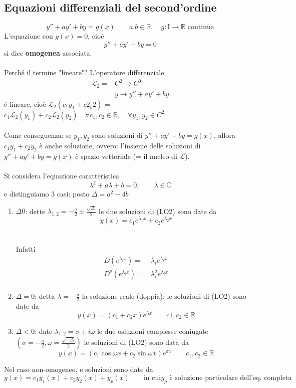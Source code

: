 \documentclass[x11names]{article}
\begin{document}
	\subsection{Equazioni differenziali del second'ordine}
	\[
	y'' + ay' + by = g(x) \qquad a.b \in \mathbb{R}, \quad g:\text{I} \to \mathbb{R} \text{ continua}
	\]
	L'equazione con $g(x) = 0$, cioè
	\[
	y'' + ay' + by = 0
	\]
	si dice \textbf{omogenea} associata. \\ \\
	
	\noindent
	Perché il termine "lineare"? L'operatore differenziale
	\begin{align*}
		\mathcal{L}_2 =& C^2 \to C^0 \\
		& y \to y'' + ay' + by
	\end{align*}
	è lineare, cioè $\mathcal{L}_2 (c_1y_1 + c2_y2)$ = $c_1 \mathcal{L}_2(y_1) + c_2 \mathcal{L}_2(y_2) \quad \forall c_1, c_2 \in \mathbb{R}, \quad \forall y_1,y_2 \in C^2$ \\ \\
	
	\noindent
	Come conseguenza: se $y_1,y_2$ sono soluzioni di $	y'' + ay' + by = g(x)$, allora $c_1y_1 + c_2y_2$ è anche soluzione, ovvero:
 l'insieme delle soluzioni di 	$y'' + ay' + by = g(x)$ è spazio vettoriale (= il nucleo di $\mathcal{L}$). \\ \\
 
\noindent
Si considera l'equazione caratteristica
\[
\lambda^2 + a \lambda + b = 0, \qquad \lambda \in \mathbb{C}
\]
e distinguiamo 3 casi: posto $\Delta = a^2 - 4b$

\begin{enumerate}
	\item $\Delta 0$: dette $\lambda_{1,2} = - \frac{a}{2} \pm \frac{\sqrt{\Delta}}{2}$ le due soluzioni di (LO2) sono date da 
	\[
	y(x) = c_1 e^{\lambda_1 x} + c_2 e^{\lambda_2 x} 
	\] \\ \\
	
	\noindent
	Infatti 
	\begin{align*}
		D\left(e^{\lambda_i x}\right) =& \lambda_i e^{\lambda_i x} \\ 
		D^2\left(e^{\lambda_i x}\right) =& \lambda_i^2 e^{\lambda_i x} \\ 
	\end{align*}
	\item $\Delta = 0$: detta $\lambda = - \frac{a}{2}$ la soluzione reale (doppia): le soluzioni di (LO2) sono date da 
	\[
	y(x) = \left(c_1 + c_2x\right)e^{\lambda x} \qquad c1, c_2 \in \mathbb{R}
	\]
	\item $\Delta < 0$: date $\lambda_{1,2} = \sigma \pm i \omega$ le due osluzioni complesse coniugate $\left(\sigma = - \frac{a}{2}, \omega = \frac{\sqrt{-\Delta}}{2}\right)$ le soluzioni di (LO2) sono data da
	\[
	y(x) = \left(c_1\cos{\omega x} + c_2 \sin{\omega x}\right) e^{\sigma x} \qquad c_1,c_2 \in \mathbb{R}
	\]
\end{enumerate} 

Nel caso non-omogeneo, e soluzioni sono date da 
\[
y(x) = c_1y_1(x) + c_2y_2(x) + y_p(x) \qquad \text{in cui} y_p \text{ è soluzione particolare dell'eq. completa}
\]
\end{document}

